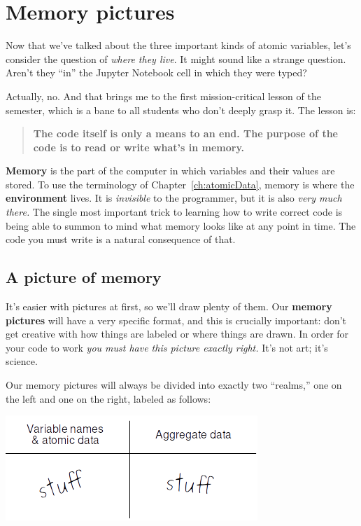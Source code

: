 
\chapter{Memory pictures}
\label{ch:memoryPictures}

Now that we've talked about the three important kinds of atomic variables,
let's consider the question of \textit{where they live}. It might sound like a
strange question. Aren't they ``in'' the Jupyter Notebook cell in which they
were typed?

Actually, no. And that brings me to the first mission-critical lesson of the
semester, which is a bane to all students who don't deeply grasp it. The lesson
is:

\begin{framed}
\begin{quote}
\textbf{The code itself is only a means to an end. The purpose of the code is
to read or write what's in memory.}
\end{quote}
\end{framed}

\textbf{Memory} is the part of the computer in which variables and their values
are stored. To use the terminology of Chapter~\ref{ch:atomicData}, memory is
where the \textbf{environment} lives. It is \textit{invisible} to the
programmer, but it is also \textit{very much there.} The single most important
trick to learning how to write correct code is being able to summon to mind
what memory looks like at any point in time. The code you must write is a
natural consequence of that.

\section{A picture of memory}

It's easier with pictures at first, so we'll draw plenty of them. Our
\textbf{memory pictures} will have a very specific format, and this is
crucially important: don't get creative with how things are labeled or where
things are drawn. In order for your code to work \textit{you must have this
picture exactly right.} It's not art; it's science.

Our memory pictures will always be divided into exactly two ``realms,'' one on
the left and one on the right, labeled as follows:

\begin{center}
\includegraphics[width=.7\textwidth]{memoryPicture.png}
\label{fig:memoryPicture}
\end{center}

